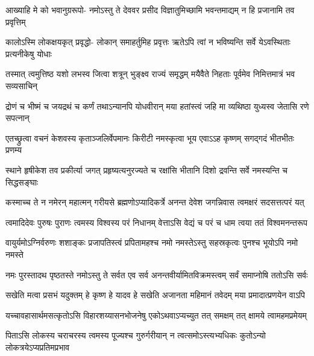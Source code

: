 \fourlineindentedshloka
{आख्याहि मे को भवानुग्ररूपो-}
{नमोऽस्तु ते देववर प्रसीद}
{विज्ञातुमिच्छामि भवन्तमाद्यम्}
{न हि प्रजानामि तव प्रवृत्तिम्}%

{}
\fourlineindentedshloka
{कालोऽस्मि लोकक्षयकृत् प्रवृद्धो-}
{लोकान् समाहर्तुमिह प्रवृत्तः}
{ऋतेऽपि त्वां न भविष्यन्ति सर्वे}
{येऽवस्थिताः प्रत्यनीकेषु योधाः}%

\fourlineindentedshloka
{तस्मात् त्वमुत्तिष्ठ यशो लभस्व}
{जित्वा शत्रून् भुङ्क्ष्व राज्यं समृद्धम्}
{मयैवैते निहताः पूर्वमेव}
{निमित्तमात्रं भव सव्यसाचिन्}%

\fourlineindentedshloka
{द्रोणं च भीष्मं च जयद्रथं च}
{कर्णं तथाऽन्यानपि योधवीरान्}
{मया हतांस्त्वं जहि मा व्यथिष्ठा}
{युध्यस्व जेतासि रणे सपत्नान्}%

\fourlineindentedshloka
{एतच्छ्रुत्वा वचनं केशवस्य}
{कृताञ्जलिर्वेपमानः किरीटी}
{नमस्कृत्वा भूय एवाऽऽह कृष्णम्}
{सगद्गदं भीतभीतः प्रणम्य}%

{}
\fourlineindentedshloka
{स्थाने हृषीकेश तव प्रकीर्त्या}
{जगत् प्रहृष्यत्यनुरज्यते च}
{रक्षांसि भीतानि दिशो द्रवन्ति}
{सर्वे नमस्यन्ति च सिद्धसङ्घाः}%

\fourlineindentedshloka
{कस्माच्च ते न नमेरन् महात्मन्}
{गरीयसे ब्रह्मणोऽप्यादिकर्त्रे}
{अनन्त देवेश जगन्निवास}
{त्वमक्षरं सदसत्तत्परं यत्}%

\fourlineindentedshloka
{त्वमादिदेवः पुरुषः पुराणः}
{त्वमस्य विश्वस्य परं निधानम्}
{वेत्ताऽसि वेद्यं च परं च धाम}
{त्वया ततं विश्वमनन्तरूप}%

\fourlineindentedshloka
{वायुर्यमोऽग्निर्वरुणः शशाङ्कः}
{प्रजापतिस्त्वं प्रपितामहश्च}
{नमो नमस्तेऽस्तु सहस्रकृत्वः}
{पुनश्च भूयोऽपि नमो नमस्ते}%

\fourlineindentedshloka
{नमः पुरस्तादथ पृष्ठतस्ते}
{नमोऽस्तु ते सर्वत एव सर्व}
{अनन्तवीर्यामितविक्रमस्त्वम्}
{सर्वं समाप्नोषि ततोऽसि सर्वः}%

\fourlineindentedshloka
{सखेति मत्वा प्रसभं यदुक्तम्}
{हे कृष्ण हे यादव हे सखेति}
{अजानता महिमानं तवेदम्}
{मया प्रमादात्प्रणयेन वाऽपि}%

\fourlineindentedshloka
{यच्चावहासार्थमसत्कृतोऽसि}
{विहारशय्यासनभोजनेषु}
{एकोऽथवाऽप्यच्युत तत् समक्षम्}
{तत् क्षामये त्वामहमप्रमेयम्}%

\fourlineindentedshloka
{पिताऽसि लोकस्य चराचरस्य}
{त्वमस्य पूज्यश्च गुरुर्गरीयान्}
{न त्वत्समोऽस्त्यभ्यधिकः कुतोऽन्यो}
{लोकत्रयेऽप्यप्रतिमप्रभाव}%

